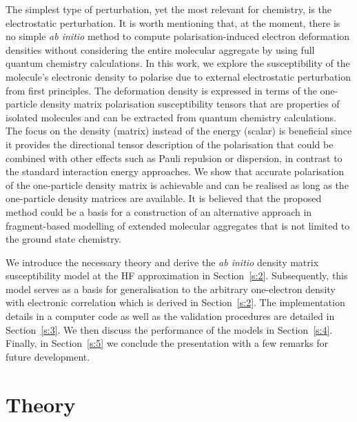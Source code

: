 \documentclass[aip,amsmath,amssymb,reprint,floatfix]{revtex4-1}
\begin{document}
The simplest type of perturbation, yet the most relevant for chemistry, is the electrostatic perturbation.
It is worth mentioning that, at the moment, there is no simple \emph{ab initio} method to compute 
polarisation\hyp{}induced electron deformation densities without considering the entire molecular 
aggregate by using full quantum chemistry calculations.\cite{
Ma.Politzer.JCP.2004,
Horn.Head-Gordon.JCP.2015,
Mandado.Hermida-Ramon.JCTC.2011}
In this work, we explore the susceptibility of the molecule's electronic density
to polarise due to external electrostatic perturbation from first principles. 
The deformation density is expressed in terms
of the one\hyp{}particle density matrix polarisation susceptibility tensors 
that are properties of isolated molecules and can be
extracted from quantum chemistry calculations. The focus on the density (matrix) instead of the energy
(scalar) is beneficial since it provides the directional tensor description
of the polarisation that could be combined with other effects such as Pauli repulsion 
or dispersion,\cite{Mandado.Hermida-Ramon.JCTC.2011}
in contrast to the standard interaction energy approaches. We show that accurate polarisation 
of the one\hyp{}particle density
matrix is achievable and can be realised as long as the one\hyp{}particle density matrices
are available. It is believed that the proposed method
could be a basis for a construction of an 
alternative approach in fragment\hyp{}based
modelling of extended molecular aggregates that is not limited to the ground state chemistry.

We introduce the necessary theory and derive the \emph{ab initio} density matrix susceptibility model
at the HF approximation\cite{Roothaan.RevModPhys.1951} 
in Section~\ref{s:2}. Subsequently, this model serves as a basis for generalisation to the 
arbitrary one\hyp{}electron density with electronic correlation which is derived in Section~\ref{s:2}. 
The implementation details in a computer code as well as the validation procedures are detailed
in Section~\ref{s:3}. We then discuss the performance of the models in Section~\ref{s:4}.
Finally, in Section~\ref{s:5} we conclude the presentation with a few 
remarks for future development.

\section{\label{s:2}Theory}
\end{document}
